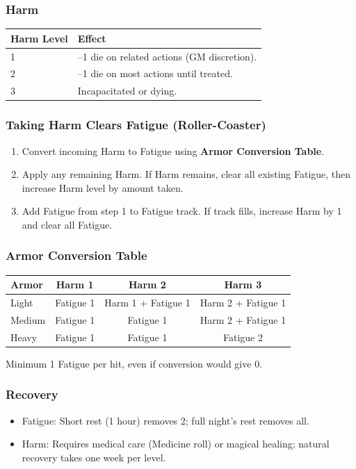 \subsubsection{Harm}
\begin{tabular}{@{}ll@{}}
\toprule
\textbf{Harm Level} & \textbf{Effect} \\
\midrule
1 & --1 die on related actions (GM discretion). \\
2 & --1 die on most actions until treated. \\
3 & Incapacitated or dying. \\
\bottomrule
\end{tabular}

\subsubsection{Taking Harm Clears Fatigue (Roller-Coaster)}
\begin{enumerate}
  \item Convert incoming Harm to Fatigue using \textbf{Armor Conversion Table}.
  \item Apply any remaining Harm. If Harm remains, clear all existing Fatigue, then increase Harm level by amount taken.
  \item Add Fatigue from step 1 to Fatigue track. If track fills, increase Harm by 1 and clear all Fatigue.
\end{enumerate}

\subsubsection{Armor Conversion Table}
\begin{tabular}{@{}lccc@{}}
\toprule
\textbf{Armor} & \textbf{Harm 1} & \textbf{Harm 2} & \textbf{Harm 3} \\
\midrule
Light  & Fatigue 1 & Harm 1 + Fatigue 1 & Harm 2 + Fatigue 1 \\
Medium & Fatigue 1 & Fatigue 1 & Harm 2 + Fatigue 1 \\
Heavy  & Fatigue 1 & Fatigue 1 & Fatigue 2 \\
\bottomrule
\end{tabular}
Minimum 1 Fatigue per hit, even if conversion would give 0.

\subsubsection{Recovery}
\begin{itemize}
  \item Fatigue: Short rest (1 hour) removes 2; full night's rest removes all.
  \item Harm: Requires medical care (Medicine roll) or magical healing; natural recovery takes one week per level.
\end{itemize}

